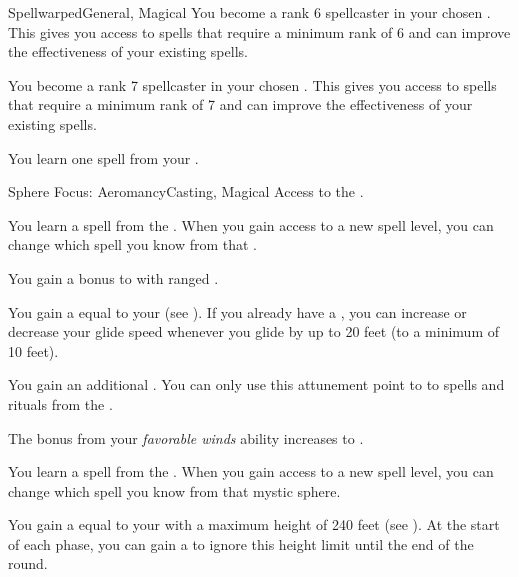 \begin{feat}{Spellwarped}{General, Magical}
         You become a rank 6 spellcaster in your chosen .
        This gives you access to spells that require a minimum rank of 6 and can improve the effectiveness of your existing spells.

         You become a rank 7 spellcaster in your chosen .
        This gives you access to spells that require a minimum rank of 7 and can improve the effectiveness of your existing spells.

         You learn one spell from your .
    \end{feat}

    \begin{feat}{Sphere Focus: Aeromancy}{Casting, Magical}
        \featpre Access to the  .

         You learn a spell from the  .
        When you gain access to a new spell level, you can change which spell you know from that .

         You gain a  bonus to  with ranged .

         You gain a  equal to your  (see ).
        If you already have a , you can increase or decrease your glide speed whenever you glide by up to 20 feet (to a minimum of 10 feet).

         You gain an additional .
        You can only use this attunement point to  to spells and rituals from the  .

         The bonus from your \textit{favorable winds} ability increases to .

         You learn a spell from the  .
        When you gain access to a new spell level, you can change which spell you know from that mystic sphere.

         You gain a  equal to your  with a maximum height of 240 feet (see ).
        At the start of each phase, you can gain a  to ignore this height limit until the end of the round.
    \end{feat}


